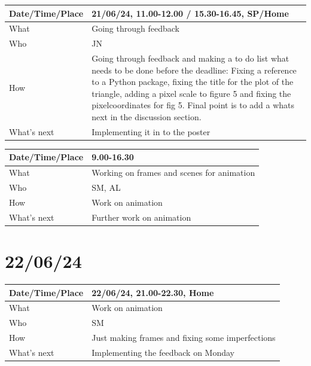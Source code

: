 \documentclass{article}
\begin{document}
\begin{table}[H]
\begin{tabular}{|p{1.5in}|p{4in}|}
\hline
Date/Time/Place & 21/06/24, 11.00-12.00 / 15.30-16.45, SP/Home \\ \hline
What            & Going through feedback \\ \hline
Who             & JN \\ \hline
How             & Going through feedback and making a to do list what needs to be done before the deadline: Fixing a reference to a Python package, fixing the title for the plot of the triangle, adding a pixel scale to figure 5 and fixing the pixelcoordinates for fig 5. Final point is to add a whats next in the discussion section. \\ \hline
What's next     & Implementing it in to the poster \\ \hline
\end{tabular}
\end{table}

\begin{table}[H]
\begin{tabular}{|p{1.5in}|p{4in}|}
\hline
Date/Time/Place & 9.00-16.30 \\ \hline
What            & Working on frames and scenes for animation \\ \hline
Who             & SM, AL \\ \hline
How             & Work on animation \\ \hline
What's next     & Further work on animation \\ \hline
\end{tabular}
\end{table}

\section{22/06/24}

\begin{table}[H]
\begin{tabular}{|p{1.5in}|p{4in}|}
\hline
Date/Time/Place & 22/06/24, 21.00-22.30, Home \\ \hline
What            & Work on animation \\ \hline
Who             & SM \\ \hline
How             & Just making frames and fixing some imperfections \\ \hline
What's next     & Implementing the feedback on Monday \\ \hline
\end{tabular}
\end{table}
\end{document}
